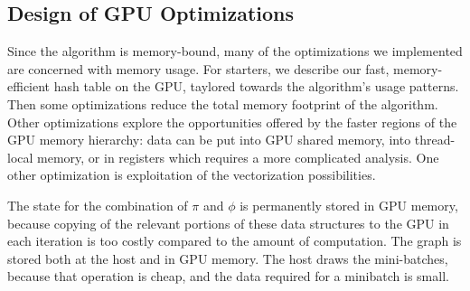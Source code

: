 
\subsection{Design of GPU Optimizations}


Since the algorithm is memory-bound, many of the optimizations we implemented
are concerned with
memory usage. For starters, we describe our fast, memory-efficient hash table on the GPU,
taylored towards
the algorithm's usage patterns. Then some optimizations reduce the total memory
footprint of the algorithm. Other
optimizations explore the opportunities offered by the faster regions of the
GPU memory hierarchy: data can be put into GPU shared memory, into thread-local
memory, or in registers which requires a more complicated analysis. One
other optimization is exploitation of the vectorization possibilities.

The state for the combination of $\pi$ and $\phi$ is permanently
stored in GPU memory, because copying of the relevant portions of these
data structures to the GPU in each iteration is too costly compared to the amount
of computation. The graph is stored both at the host and in GPU memory. The
host draws the mini-batches, because that operation is cheap,
and the data required for a minibatch is small.

